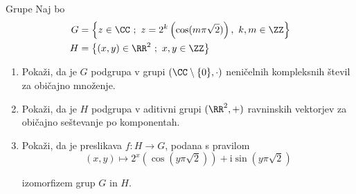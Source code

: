 \begin{frame}{Grupe}
	Naj bo
	\begin{align*}
		G &= \left\{ z \in \CC \ ; \ z = 2^{k} \left( \cos(m \pi \sqrt{2}) \right), \ k, m \in \ZZ \right\} \\
		H &= \left\{ ( x, y ) \in \RR^{2} \ ; \ x, y \in \ZZ \right\}
		\end{align*}
		

	\begin{enumerate}
		\item
			Pokaži, da je $G$ podgrupa v grupi $(\CC \setminus \{0\}, \cdot)$
			neničelnih kompleksnih števil za običajno množenje.
		\item
			Pokaži, da je $H$ podgrupa v aditivni grupi $(\RR^{2}, +)$
			ravninskih vektorjev za običajno seštevanje po komponentah.
		\item
			Pokaži, da je preslikava $f:H\to G$, podana s pravilom
			\[
            ( x, y ) \mapsto 2^{x} \left( \cos\left( y \pi \sqrt{2} \right) \right) + \mathrm{i} \sin\left( y \pi \sqrt{2} \right)
            \]

			izomorfizem grup $G$ in $H$.
	\end{enumerate}
\end{frame}
